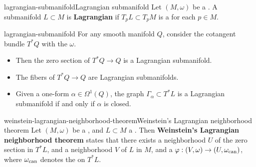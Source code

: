 \begin{topic}{lagrangian-submanifold}{Lagrangian submanifold}
    Let $(M, \omega)$ be a . A submanifold $L \subset M$ is \textbf{Lagrangian} if $T_p L \subset T_p M$ is a  for each $p \in M$.
\end{topic}

\begin{example}{lagrangian-submanifold}
    For any smooth manifold $Q$, consider the cotangent bundle $T^*Q$ with the  $\omega$.
    \begin{itemize}
        \item Then the zero section of $T^*Q \to Q$ is a Lagrangian submanifold.
        \item The fibers of $T^*Q \to Q$ are Lagrangian submanifolds.
        \item Given a one-form $\alpha \in \Omega^1(Q)$, the graph $\Gamma_\alpha \subset T^*L$ is a Lagrangian submanifold if and only if $\alpha$ is closed.
    \end{itemize}
\end{example}

\begin{topic}{weinstein-lagrangian-neighborhood-theorem}{Weinstein's Lagrangian neighborhood theorem}
    Let $(M, \omega)$ be a , and $L \subset M$ a  . Then \textbf{Weinstein's Lagrangian neighborhood theorem} states that there exists a neighborhood $U$ of the zero section in $T^*L$, and a neighborhood $V$ of $L$ in $M$, and a  $\varphi : (V, \omega) \to (U, \omega_\textup{can})$, where $\omega_\textup{can}$ denotes the  on $T^*L$.
\end{topic}



